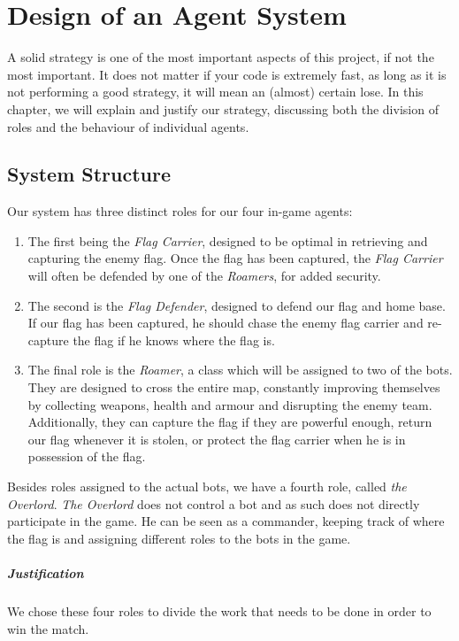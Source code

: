\chapter{Design of an Agent System}

A solid strategy is one of the most important aspects of this project, if not the most important. It does not matter if your code is extremely fast, as long as it is not performing a good strategy, it will mean an (almost) certain lose. In this chapter, we will explain and justify our strategy, discussing both the division of roles and the behaviour of individual agents.

\section{System Structure}
Our system has three distinct roles for our four in-game agents:

\begin{enumerate}
\item The first being the \emph{Flag Carrier}, designed to be optimal in retrieving and capturing the enemy flag. Once the flag has been captured, the \emph{ Flag Carrier} will often be defended by one of the \emph{Roamers}, for added security.

\item The second is the \emph{Flag Defender}, designed to defend our flag and home base. If our flag has been captured, he should chase the enemy flag carrier and re-capture the flag if he knows where the flag is. 

\item The final role is the \emph{Roamer}, a class which will be assigned to two of the bots. They are designed to cross the entire map, constantly improving themselves by collecting weapons, health and armour and disrupting the enemy team. Additionally, they can capture the flag if they are powerful enough, return our flag whenever it is stolen, or protect the flag carrier when he is in possession of the flag.
\end{enumerate}

Besides roles assigned to the actual bots, we have a fourth role, called \emph{the Overlord}. \emph{The Overlord} does not control a bot and as such does not directly participate in the game. He can be seen as a commander, keeping track of where the flag is and assigning different roles to the bots in the game.\\

\paragraph{Justification}
We chose these four roles to divide the work that needs to be done in order to win the match.

